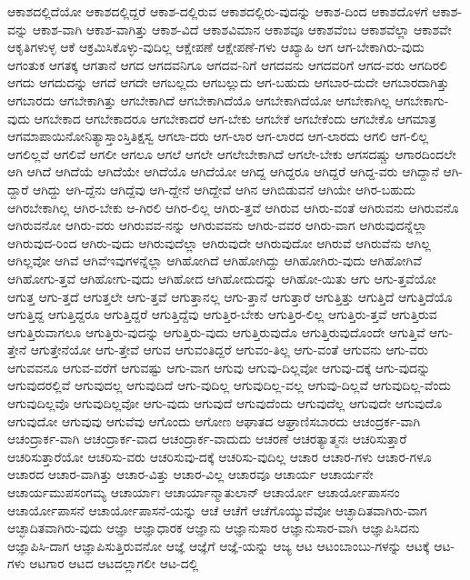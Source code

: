 {ಆಕಾಶದಲ್ಲಿದೆಯೋ
ಆಕಾಶದಲ್ಲಿದ್ದರೆ
ಆಕಾಶ-ದಲ್ಲಿರುವ
ಆಕಾಶದಲ್ಲಿರು-ವುದನ್ನು
ಆಕಾಶ-ದಿಂದ
ಆಕಾಶದೊಳಗೆ
ಆಕಾಶ-ವನ್ನು
ಆಕಾಶ-ವಾಗಿ
ಆಕಾಶ-ವಾಗಿತ್ತು
ಆಕಾಶ-ವಿದೆ
ಆಕಾಶವಿಮಾನ
ಆಕಾಶವೂ
ಆಕಾಶವೆಂಬ
ಆಕಾಶವೆಲ್ಲಾ
ಆಕಾಶವೇ
ಆಕೃತಿಗಳುಳ್ಳ
ಆಕೆ
ಆಕ್ರಮಿಸಿಕೊಳ್ಳು-ವುದಿಲ್ಲ
ಆಕ್ಷೇಪಣೆ
ಆಕ್ಷೇಪಣೆ-ಗಳು
ಆಖ್ಯಾಹಿ
ಆಗ
ಆಗ-ಬೇಕಾಗಿರು-ವುದು
ಆಗಂತುಕ
ಆಗತಕ್ಕ
ಆಗತಾನೆ
ಆಗದ
ಆಗದವನಿಗೂ
ಆಗದವ-ನಿಗೆ
ಆಗದವನು
ಆಗದವರಿಗೆ
ಆಗದ-ವರು
ಆಗದಿರಲಿ
ಆಗದು
ಆಗದುದನ್ನು
ಆಗದೆ
ಆಗದೇ
ಆಗಬಲ್ಲದು
ಆಗಬಲ್ಲುದು
ಆಗ-ಬಹುದು
ಆಗಬಾರ-ದುದೇ
ಆಗಬಾರದಾಗಿತ್ತು
ಆಗಬಾರದು
ಆಗಬೇಕಾಗಿತ್ತು
ಆಗಬೇಕಾಗಿದೆ
ಆಗಬೇಕಾಗಿದೆಯೊ
ಆಗಬೇಕಾಗಿದೆಯೋ
ಆಗಬೇಕಾಗಿಲ್ಲ
ಆಗಬೇಕಾಗು-ವುದು
ಆಗಬೇಕಾದ
ಆಗಬೇಕಾದರೂ
ಆಗಬೇಕಾದರೆ
ಆಗ-ಬೇಕು
ಆಗಬೇಕೆ
ಆಗಬೇಕೆಂದು
ಆಗಬೇಕೊ
ಆಗಮಾತ್ರ
ಆಗಮಾಪಾಯಿನೋನಿತ್ಯಾಸ್ತಾಂಸ್ತಿತಿಕ್ಷಸ್ವ
ಆಗಲಾ-ದರು
ಆಗ-ಲಾರ
ಆಗ-ಲಾರದ
ಆಗ-ಲಾರದು
ಆಗಲಿ
ಆಗ-ಲಿಲ್ಲ
ಆಗಲಿಲ್ಲವೆ
ಆಗಲಿವೆ
ಆಗಲೀ
ಆಗಲೂ
ಆಗಲೆ
ಆಗಲೇ
ಆಗಲೇಬೇಕಾಗಿದೆ
ಆಗಲೇ-ಬೇಕು
ಆಗಸದಷ್ಚು
ಆಗಾರದಿಂದಲೇ
ಆಗಿ
ಆಗಿದೆ
ಆಗಿದೆಯೆ
ಆಗಿದೆಯೇ
ಆಗಿದೆಯೊ
ಆಗಿದೆಯೋ
ಆಗಿದ್ದ
ಆಗಿದ್ದರೂ
ಆಗಿದ್ದರೆ
ಆಗಿದ್ದ-ವರು
ಆಗಿದ್ದಾನೆ
ಆಗಿ-ದ್ದಾರೆ
ಆಗಿದ್ದು
ಆಗಿ-ದ್ದೆನು
ಆಗಿದ್ದೆವು
ಆಗಿ-ದ್ದೇನೆ
ಆಗಿದ್ದೇವೆ
ಆಗಿನ
ಆಗಿಬಿಡುವನೆ
ಆಗಿಯೇ
ಆಗಿರ-ಬಹುದು
ಆಗಿರಬೇಕಾಗಿಲ್ಲ
ಆಗಿರ-ಬೇಕು
ಆ-ಗಿರಲಿ
ಆಗಿರ-ಲಿಲ್ಲ
ಆಗಿರು-ತ್ತವೆ
ಆಗಿರುವ
ಆಗಿರು-ವಂತೆ
ಆಗಿರುವನು
ಆಗಿರುವನೊ
ಆಗಿರುವನೋ
ಆಗಿರು-ವರು
ಆಗಿರುವವ-ನನ್ನು
ಆಗಿರುವವನು
ಆಗಿರು-ವವರ
ಆಗಿರು-ವಾಗ
ಆಗಿರುವುದನ್ನೆಲ್ಲಾ
ಆಗಿರುವುದ-ರಿಂದ
ಆಗಿರು-ವುದು
ಆಗಿರುವುದೆಲ್ಲಾ
ಆಗಿರುವುದೇ
ಆಗಿರುವುದೋ
ಆಗಿರುವೆ
ಆಗಿರುವೆನು
ಆಗಿಲ್ಲ
ಆಗಿಲ್ಲವೋ
ಆಗಿವೆ
ಆಗಿವೆಇವುಗಳನ್ನೆಲ್ಲಾ
ಆಗಿಹೋಗಿದೆ
ಆಗಿಹೋಗಿದ್ದು
ಆಗಿಹೋಗಿರು-ವುದು
ಆಗಿಹೋಗಿವೆ
ಆಗಿಹೋಗು-ತ್ತವೆ
ಆಗಿಹೋಗು-ವುದು
ಆಗಿಹೋದ
ಆಗಿಹೋದುದನ್ನು
ಆಗಿಹೋ-ಯಿತು
ಆಗು
ಆಗು-ತ್ತವೆಯೋ
ಆಗುತ್ತ
ಆಗು-ತ್ತದೆ
ಆಗುತ್ತಲೇ
ಆಗು-ತ್ತವೆ
ಆಗುತ್ತಾನಲ್ಲ
ಆಗು-ತ್ತಾನೆ
ಆಗುತ್ತಾರೆ
ಆಗುತ್ತಿತ್ತು
ಆಗುತ್ತಿದೆ
ಆಗುತ್ತಿದೆಯೊ
ಆಗುತ್ತಿದ್ದ
ಆಗುತ್ತಿದ್ದರೂ
ಆಗುತ್ತಿದ್ದರೆ
ಆಗುತ್ತಿದ್ದೆವು
ಆಗುತ್ತಿರ-ಬೇಕು
ಆಗುತ್ತಿರ-ಲಿಲ್ಲ
ಆಗುತ್ತಿರು-ತ್ತವೆ
ಆಗುತ್ತಿರುವ
ಆಗುತ್ತಿರುವಾಗಲೂ
ಆಗುತ್ತಿರು-ವುದನ್ನು
ಆಗುತ್ತಿರು-ವುದು
ಆಗುತ್ತಿರುವುದೊ
ಆಗುತ್ತಿರುವುದೊಂದೇ
ಆಗುತ್ತಿವೆ
ಆಗು-ತ್ತೇನೆ
ಆಗುತ್ತೇನೆಯೋ
ಆಗು-ತ್ತೇವೆ
ಆಗುವ
ಆಗುವಂತಿದ್ದರೆ
ಆಗುವಂ-ತಿಲ್ಲ
ಆಗು-ವಂತೆ
ಆಗುವನು
ಆಗು-ವರು
ಆಗುವವನೂ
ಆಗುವ-ವರೆಗೆ
ಆಗುವಷ್ಟು
ಆಗು-ವಾಗ
ಆಗುವು
ಆಗುವು-ದಿಲ್ಲವೋ
ಆಗುವು-ದಕ್ಕೆ
ಆಗು-ವುದನ್ನು
ಆಗುವುದರಲ್ಲಿವೆ
ಆಗುವುದಲ್ಲ
ಆಗುವುದಿದೆ
ಆಗು-ವುದಿಲ್ಲ
ಆಗುವುದಿಲ್ಲ-ವಲ್ಲ
ಆಗುವು-ದಿಲ್ಲವೆ
ಆಗುವುದಿಲ್ಲ-ವೆಂದು
ಆಗುವುದಿಲ್ಲವೊ
ಆಗುವುದಿಲ್ಲವೋ
ಆಗು-ವುದು
ಆಗುವುದೆ
ಆಗುವುದೆಂದು
ಆಗುವುದೆಲ್ಲ
ಆಗುವುದೇ
ಆಗುವುದೊ
ಆಗುವುದೋ
ಆಗುವುವು
ಆಗುವೆವು
ಆಗೊಂದು
ಆಗೋಣ
ಆಘಾತದ
ಆಘ್ರಾಣಿಸಬಾರದು
ಆಚಂದ್ರರ್ಕ-ವಾಗಿ
ಆಚಂದ್ರಾರ್ಕ-ವಾಗಿ
ಆಚಂದ್ರಾರ್ಕ-ವಾದ
ಆಚಂದ್ರಾರ್ಕ-ವಾದುದು
ಆಚರಣೆ
ಆಚರತ್ಯಾತ್ಮನಃ
ಆಚರಿಸುತ್ತಾರೆ
ಆಚರಿಸುತ್ತಾರೆಯೋ
ಆಚರಿಸು-ವರು
ಆಚರಿಸುವು-ದಕ್ಕೆ
ಆಚರಿಸು-ವುದಿಲ್ಲ
ಆಚಾರ
ಆಚಾರ-ಗಳು
ಆಚಾರ-ಗಳೂ
ಆಚಾರದ
ಆಚಾರ-ವಾಗಿತ್ತು
ಆಚಾರ-ವಿತ್ತು
ಆಚಾರ-ವಿಲ್ಲ
ಆಚಾರವೂ
ಆಚಾರ್ಯ
ಆಚಾರ್ಯನೇ
ಆಚಾರ್ಯಮುಪಸಂಗಮ್ಯ
ಆಚಾರ್ಯಾಃ
ಆಚಾರ್ಯಾನ್ಮಾತುಲಾನ್
ಆಚಾರ್ಯೋ
ಆಚಾರ್ಯೋಪಾಸನಂ
ಆಚಾರ್ಯೋಪಾಸನೆ
ಆಚಾರ್ಯೋಪಾಸನೆ-ಯನ್ನು
ಆಚೆ
ಆಚೆಗೆ
ಆಚೆಗೊಯ್ಯುವೆವೋ
ಆಚ್ಛಾದಿತವಾಗಿರು-ವಾಗ
ಆಚ್ಛಾದಿತವಾಗಿರು-ವುದು
ಆಜ್ಞಾ
ಆಜ್ಞಾಧಾರಕ
ಆಜ್ಞಾನು
ಆಜ್ಞಾನುಸಾರ
ಆಜ್ಞಾನುಸಾರ-ವಾಗಿ
ಆಜ್ಞಾಪಿಸಿದನು
ಆಜ್ಞಾಪಿಸಿ-ದಾಗ
ಆಜ್ಞಾಪಿಸುತ್ತಿರುವನೋ
ಆಜ್ಞೆ
ಆಜ್ಞೆಗೆ
ಆಜ್ಞೆ-ಯನ್ನು
ಆಜ್ಯ
ಆಟ
ಆಟಂಬಾಂಬು-ಗಳನ್ನು
ಆಟಕ್ಕೆ
ಆಟ-ಗಳು
ಆಟಗಾರ
ಆಟದ
ಆಟದಲ್ಲಾಗಲೀ
ಆಟ-ದಲ್ಲಿ
}
